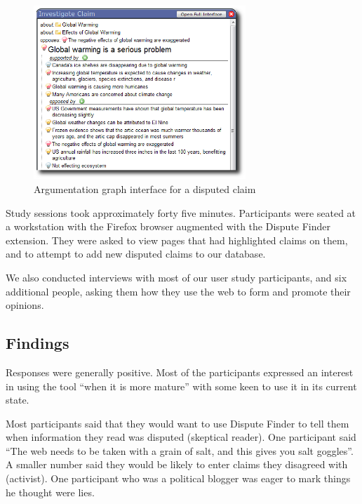 \documentclass{www2010-submission}
\newcommand{\todo}[1]{}
\begin{document}
\begin{figure}[tb]
	\begin{center}
	\includegraphics[width=8cm]{pictures/popup_graph_crop.png}
	\caption{Argumentation graph interface for a disputed claim}
	\label{popup_graph}
	\end{center}
\end{figure}


Study sessions took approximately forty five minutes. Participants were seated at a workstation with the Firefox browser augmented with the Dispute Finder extension. They were asked to view pages that had highlighted claims on them, and to attempt to add new disputed claims to our database.

We also conducted interviews with most of our user study participants, and six additional people, asking them how they use the web to form and promote their opinions.

\todo{Need to finish the third wave of user studies}

\subsection{Findings}

Responses were generally positive. Most of the participants expressed an interest in using the tool ``when it is more mature'' with some keen to use it in its current state.

\todo{Tye: say how many were keen to use the tool.}

Most participants said that they would want to use Dispute Finder to tell them when information they read was disputed (skeptical reader). One participant said ``The web needs to be taken with a grain of salt, and this gives you salt goggles''. A smaller number said they would be likely to enter claims they disagreed with (activist). One participant who was a political blogger was eager to mark things he thought were lies.
\end{document}
